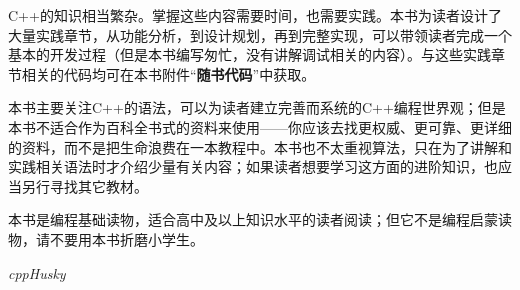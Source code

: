 C++的知识相当繁杂。掌握这些内容需要时间，也需要实践。本书为读者设计了大量实践章节，从功能分析，到设计规划，再到完整实现，可以带领读者完成一个基本的开发过程（但是本书编写匆忙，没有讲解调试相关的内容）。与这些实践章节相关的代码均可在本书附件``\textbf{随书代码}''中获取。\par
本书主要关注C++的语法，可以为读者建立完善而系统的C++编程世界观；但是本书不适合作为百科全书式的资料来使用——你应该去找更权威、更可靠、更详细的资料，而不是把生命浪费在一本教程中。本书也不太重视算法，只在为了讲解和实践相关语法时才介绍少量有关内容；如果读者想要学习这方面的进阶知识，也应当另行寻找其它教材。\par
本书是编程基础读物，适合高中及以上知识水平的读者阅读；但它不是编程启蒙读物，请不要用本书折磨小学生。\par
\begin{flushright}
\textit{cppHusky}\par
\end{flushright}